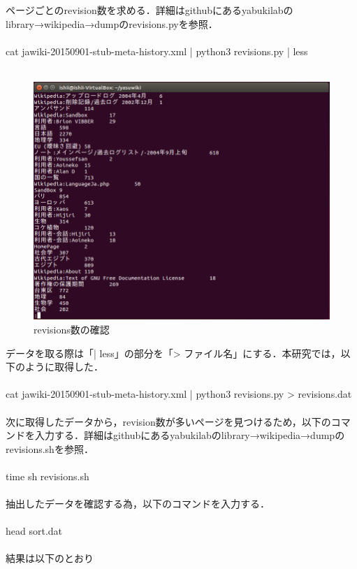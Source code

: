 ページごとのrevision数を求める．詳細はgithubにあるyabukilabのlibrary→wikipedia→dumpのrevisions.pyを参照．
\\
\\
cat jawiki-20150901-stub-meta-history.xml | python3 revisions.py | less
\\
\\
\begin{figure}[H]
\centering
\includegraphics[width=14cm]{wiki_revisions.png}
\caption{revisions数の確認}\label{サンプル図}
\end{figure}

データを取る際は「| less」の部分を「> ファイル名」にする．本研究では，以下のように取得した．
\\
\\
cat jawiki-20150901-stub-meta-history.xml | python3 revisions.py > revisions.dat
\\
\\
次に取得したデータから，revision数が多いページを見つけるため，以下のコマンドを入力する．詳細はgithubにあるyabukilabのlibrary→wikipedia→dumpのrevisions.shを参照．
\\
\\
time sh revisions.sh
\\
\\
抽出したデータを確認する為，以下のコマンドを入力する．
\\
\\
head sort.dat
\\
\\
結果は以下のとおり

